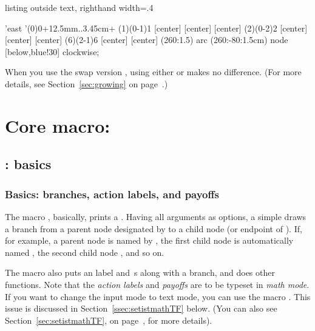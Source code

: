 \begin{tcblisting}{listing outside text, righthand width=.4\linewidth}
\begin{istgame}
\setistgrowdirection'{east}
\setistOvalNodeStyle{.6cm}
\istrooto'(0){0}+{12.5mm}..{3.45cm}+
  \istb  \istb  \endist
{}
\xtdistance{12.5mm}{11.5mm}
\istrooto(1)(0-1){1}
  [center]  [center]
  [center]  \endist
\istrooto(2)(0-2){2}
  [center]  [center]
  [center]  \endist
\istrooto(6)(2-1){6}
  [center]  [center]
  \endist
{}(260:1.5) 
  arc (260:-80:1.5cm)
  node [below,blue!30] {clockwise};
\end{istgame}
\end{tcblisting}

\remark
When you use the swap version , using either \cmd{\istroot} or  makes no difference. (For more details, see Section~\ref{sec:growing} on page~\pageref{sec:growing}.)


\section{Core macro: \protect\cmd{\istb}}
\label{sec:istb}

\subsection{\protect\cmd{\istb}: basics}
\label{ssec:istb}

\subsubsection{Basics: branches, action labels, and payoffs}

The macro \icmd{\istb}, basically, prints a \emph{}. 
Having all arguments as options, a simple \cmd{\istb} draws a branch from a parent node designated by \cmd{\istroot} to a child node (or endpoint of \cmd{\istb}).
If, for example, a parent node is named  by \cmd{\istroot}, the first child node is automatically named , the second child node , and so on.

The macro \cmd{\istb} also puts an \emph{} label and \emph{\,}s along with a branch, and does other functions.
Note that the \emph{action labels} and \emph{payoffs} are to be typeset in \emph{math mode}. 
If you want to change the input mode to text mode, you can use the macro \cmd{\setistmathTF(*)}.
This issue is discussed in Section~\ref{ssec:setistmathTF} below. (You can also see Section~\ref{sec:setistmathTF}, on page~\pageref{sec:setistmathTF}, for more details).

